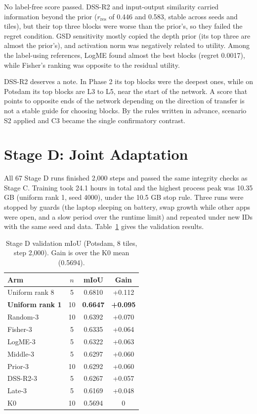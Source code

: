 \documentclass[11pt,a4paper]{report}
\begin{document}
No label-free score passed. DSS-R2 and input-output similarity carried information beyond the prior ($r_{\text{res}}$ of 0.446 and 0.583, stable across seeds and tiles), but their top three blocks were worse than the prior's, so they failed the regret condition. GSD sensitivity mostly copied the depth prior (its top three are almost the prior's), and activation norm was negatively related to utility. Among the label-using references, LogME found almost the best blocks (regret 0.0017), while Fisher's ranking was opposite to the residual utility.

DSS-R2 deserves a note. In Phase 2 its top blocks were the deepest ones, while on Potsdam its top blocks are L3 to L5, near the start of the network. A score that points to opposite ends of the network depending on the direction of transfer is not a stable guide for choosing blocks. By the rules written in advance, scenario S2 applied and C3 became the single confirmatory contrast.

\section{Stage D: Joint Adaptation}

All 67 Stage D runs finished 2,000 steps and passed the same integrity checks as Stage C. Training took 24.1 hours in total and the highest process peak was 10.35 GB (uniform rank 1, seed 4000), under the 10.5 GB stop rule. Three runs were stopped by guards (the laptop sleeping on battery, swap growth while other apps were open, and a slow period over the runtime limit) and repeated under new IDs with the same seed and data. Table~\ref{tab:stagedval} gives the validation results.

\begin{table}[t]
\centering
\caption{Stage D validation mIoU (Potsdam, 8 tiles, step 2,000). Gain is over the K0 mean (0.5694).}
\label{tab:stagedval}
\small
\setlength{\tabcolsep}{4pt}
\begin{tabular}{@{}lccc@{}}
\toprule
\textbf{Arm} & \textbf{$n$} & \textbf{mIoU} & \textbf{Gain} \\
\midrule
Uniform rank 8 & 5 & 0.6810 & +0.112 \\
\textbf{Uniform rank 1} & 10 & \textbf{0.6647} & \textbf{+0.095} \\
Random-3 & 10 & 0.6392 & +0.070 \\
Fisher-3 & 5 & 0.6335 & +0.064 \\
LogME-3 & 5 & 0.6322 & +0.063 \\
Middle-3 & 5 & 0.6297 & +0.060 \\
Prior-3 & 10 & 0.6292 & +0.060 \\
DSS-R2-3 & 5 & 0.6267 & +0.057 \\
Late-3 & 5 & 0.6169 & +0.048 \\
K0 & 10 & 0.5694 & 0 \\
\bottomrule
\end{tabular}
\end{table}
\end{document}
